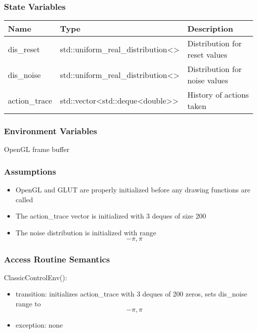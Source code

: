 \documentclass[12pt, titlepage]{article}
\begin{document}
\subsubsection{State Variables}
\begin{center}
  \begin{tabular}{p{4cm} p{6cm} p{4cm}}
    \hline
    \textbf{Name} & \textbf{Type} & \textbf{Description} \\
    \hline
    dis\_reset & std::uniform\_real\_distribution\textless \textgreater & Distribution for reset values \\
    \hline
    dis\_noise & std::uniform\_real\_distribution\textless \textgreater & Distribution for noise values \\
    \hline
    action\_trace & std::vector\textless std::deque\textless double\textgreater\textgreater & History of actions taken \\
    \hline
  \end{tabular}
\end{center}

\subsubsection{Environment Variables}
OpenGL frame buffer

\subsubsection{Assumptions}
\begin{itemize}
  \item OpenGL and GLUT are properly initialized before any drawing functions are called  
  \item The action\_trace vector is initialized with 3 deques of size 200
  \item The noise distribution is initialized with range \[-\pi, \pi\]

\end{itemize}

\subsubsection{Access Routine Semantics}

\noindent ClassicControlEnv():
\begin{itemize}
  \item transition: initializes action\_trace with 3 deques of 200 zeros, sets dis\_noise range to\[-\pi, \pi\]
  
  \item exception: none

\end{itemize}
\end{document}
